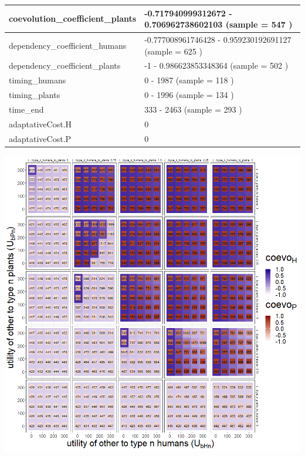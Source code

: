 \documentclass[
]{book}
\begin{document}
\begin{table}[!h]
\begin{tabular}[t]{l|l}
\hline
coevolution\_coefficient\_plants & -0.717940999312672 - 0.706962738602103 (sample = 547 )\\
\hline
dependency\_coefficient\_humans & -0.777008961746428 - 0.959230192691127 (sample = 625 )\\
\hline
dependency\_coefficient\_plants & -1 - 0.986623853348364 (sample = 502 )\\
\hline
timing\_humans & 0 - 1987 (sample = 118 )\\
\hline
timing\_plants & 0 - 1996 (sample = 134 )\\
\hline
time\_end & 333 - 2463 (sample = 293 )\\
\hline
adaptativeCost.H & 0\\
\hline
adaptativeCost.P & 0\\
\hline
\end{tabular}
\end{table}

\newpage

\includegraphics[width=1\linewidth]{plots/4_exp_type_n_traits-tripleRaster_fourParameterss}

\newpage
\end{document}

